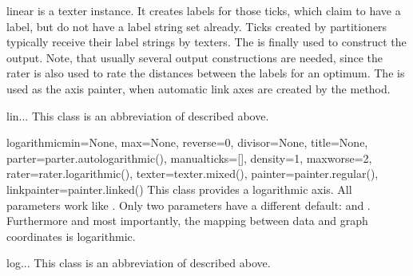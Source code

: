 \begin{classdesc}{linear}
   is a texter instance. It creates labels for those
  ticks, which claim to have a label, but do not have a label string
  set already. Ticks created by partitioners typically receive their
  label strings by texters. The  is finally used to
  construct the output. Note, that usually several output
  constructions are needed, since the rater is also used to rate the
  distances between the labels for an optimum. The 
  is used as the axis painter, when automatic link axes are created by
  the  method.
\end{classdesc}

\begin{classdesc}{lin}{...}
  This class is an abbreviation of  described above.
\end{classdesc}

\begin{classdesc}{logarithmic}{min=None, max=None, reverse=0, divisor=None, title=None,
                               parter=parter.autologarithmic(), manualticks=[],
                               density=1, maxworse=2, rater=rater.logarithmic(),
                               texter=texter.mixed(), painter=painter.regular(),
                               linkpainter=painter.linked()}
  This class provides a logarithmic axis. All parameters work like
  . Only two parameters have a different default:
   and . Furthermore and most importantly, the
  mapping between data and graph coordinates is logarithmic.
\end{classdesc}

\begin{classdesc}{log}{...}
This class is an abbreviation of  described above.
\end{classdesc}


